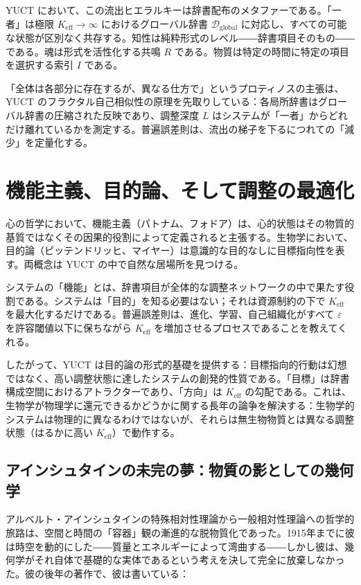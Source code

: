 \documentclass[12pt,a4paper]{article}
\begin{document}
	YUCT において、この流出ヒエラルキーは辞書配布のメタファーである。「一者」は極限 \(K_{\mathrm{eff}} \to \infty\) におけるグローバル辞書 \(\mathcal{D}_{\text{global}}\) に対応し、すべての可能な状態が区別なく共存する。知性は純粋形式のレベル――辞書項目そのもの――である。魂は形式を活性化する共鳴 \(R\) である。物質は特定の時間に特定の項目を選択する索引 \(I\) である。
	
	「全体は各部分に存在するが、異なる仕方で」というプロティノスの主張は、YUCT のフラクタル自己相似性の原理を先取りしている：各局所辞書はグローバル辞書の圧縮された反映であり、調整深度 \(L\) はシステムが「一者」からどれだけ離れているかを測定する。普遍誤差則は、流出の梯子を下るにつれての「減少」を定量化する。
	
	\section{機能主義、目的論、そして調整の最適化}
	
	心の哲学において、機能主義（パトナム、フォドア）は、心的状態はその物質的基質ではなくその因果的役割によって定義されると主張する。生物学において、目的論（ピッテンドリッヒ、マイヤー）は意識的な目的なしに目標指向性を表す。両概念は YUCT の中で自然な居場所を見つける。
	
	システムの「機能」とは、辞書項目が全体的な調整ネットワークの中で果たす役割である。システムは「目的」を知る必要はない；それは資源制約の下で \(K_{\mathrm{eff}}\) を最大化するだけである。普遍誤差則は、進化、学習、自己組織化がすべて \(\varepsilon\) を許容閾値以下に保ちながら \(K_{\mathrm{eff}}\) を増加させるプロセスであることを教えてくれる。
	
	したがって、YUCT は目的論の形式的基礎を提供する：目標指向的行動は幻想ではなく、高い調整状態に達したシステムの創発的性質である。「目標」は辞書構成空間におけるアトラクターであり、「方向」は \(K_{\mathrm{eff}}\) の勾配である。これは、生物学が物理学に還元できるかどうかに関する長年の論争を解決する：生物学的システムは物理的に異なるわけではないが、それらは無生物物質とは異なる調整状態（はるかに高い \(K_{\mathrm{eff}}\)）で動作する。
	
	\subsection{アインシュタインの未完の夢：物質の影としての幾何学}
	
	アルベルト・アインシュタインの特殊相対性理論から一般相対性理論への哲学的旅路は、空間と時間の「容器」観の漸進的な脱物質化であった。1915年までに彼は時空を動的にした――質量とエネルギーによって湾曲する――しかし彼は、幾何学がそれ自体で基礎的な実体であるという考えを決して完全に放棄しなかった。彼の後年の著作で、彼は書いている：
	
\end{document}
